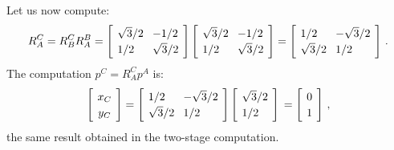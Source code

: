 \documentclass[11pt,a4paper]{report}
\newcommand*{\spacearray}{
\renewcommand{\arraystretch}{1.2}
\setlength{\arraycolsep}{4pt}
}
\begin{document}
Let us now compute:
\[
\spacearray
R^C_A=R^C_B R^B_A = 
\left[\begin{array}{l} \sqrt{3}/2 \\ 1/2 \end{array}\\
\begin{array}{l} -1/2 \\ \sqrt{3}/2 \end{array}\\
\right]
\left[\begin{array}{l} \sqrt{3}/2 \\ 1/2 \end{array}\\
\begin{array}{l} -1/2 \\ \sqrt{3}/2 \end{array}\\
\right]=
\left[\begin{array}{l} 1/2 \\ \sqrt{3}/2 \end{array}\\
\begin{array}{l} -\sqrt{3}/2 \\ 1/2\end{array}\\
\right]\,.
\]
The computation $p^C = R^C_A p^A$ is:
\[\spacearray
\left[ 
\begin{array}{c} x_C\\ y_C \end{array}
\right] =
\left[\begin{array}{l} 1/2 \\ \sqrt{3}/2 \end{array}\\
\begin{array}{l} -\sqrt{3}/2 \\ 1/2\end{array}\\
\right]
\left[\begin{array}{l} \sqrt{3}/2 \\ 1/2\end{array}\\ \right]\\ =
\left[\begin{array}{l} 0 \\ 1 \end{array}\\ \right]\,,
\]
the same result obtained in the two-stage computation.
\end{document}

